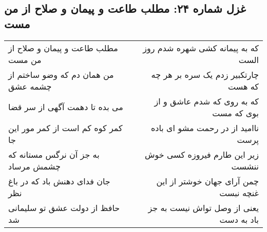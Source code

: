 \begin{center}
\section*{غزل شماره ۲۴: مطلب طاعت و پیمان و صلاح از من مست}
\label{sec:sh024}
\begin{longtable}{l p{0.5cm} r}
مطلب طاعت و پیمان و صلاح از من مست
&&
که به پیمانه کشی شهره شدم روز الست
\\
من همان دم که وضو ساختم از چشمه عشق
&&
چارتکبیر زدم یک سره بر هر چه که هست
\\
می بده تا دهمت آگهی از سر قضا
&&
که به روی که شدم عاشق و از بوی که مست
\\
کمر کوه کم است از کمر مور این جا
&&
ناامید از در رحمت مشو ای باده پرست
\\
به جز آن نرگس مستانه که چشمش مرساد
&&
زیر این طارم فیروزه کسی خوش ننشست
\\
جان فدای دهنش باد که در باغ نظر
&&
چمن آرای جهان خوشتر از این غنچه نبست
\\
حافظ از دولت عشق تو سلیمانی شد
&&
یعنی از وصل تواش نیست به جز باد به دست
\\
\end{longtable}
\end{center}
